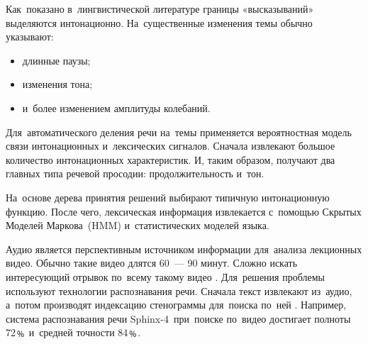 Как~показано в~лингвистической литературе границы «высказываний»
выделяются интонационно.
На~существенные изменения темы обычно указывают:
\begin{itemize}
    \item длинные паузы;
    \item изменения тона;
    \item и~более изменением амплитуды колебаний.
\end{itemize}

Для~автоматического деления речи на~темы
применяется вероятностная модель связи интонационных
и~лексических сигналов.
Сначала извлекают большое количество интонационных характеристик.
И, таким образом, получают два главных типа речевой просодии:
продолжительность и~тон.

На~основе дерева принятия решений выбирают
типичную интонационную функцию.
После чего, лексическая информация извлекается
с~помощью Скрытых Моделей
Маркова\ (HMM)
и~статистических моделей языка.

Аудио является перспективным источником информации
для~анализа лекционных видео.
Обычно такие видео длятся 60~— 90 минут.
Сложно искать интересующий отрывок по~всему такому видео \cite{Repp:2008}.
Для~решения проблемы используют технологии
распознавания речи.
Сначала текст извлекают из~аудио,
а~потом производят индексацию стенограммы для~поиска по~ней \cite{Kumar:2011}.
Например, система распознавания речи Sphinx-4\ при~поиске
по~видео достигает полноты 72﹪ и~средней точности 84﹪.


